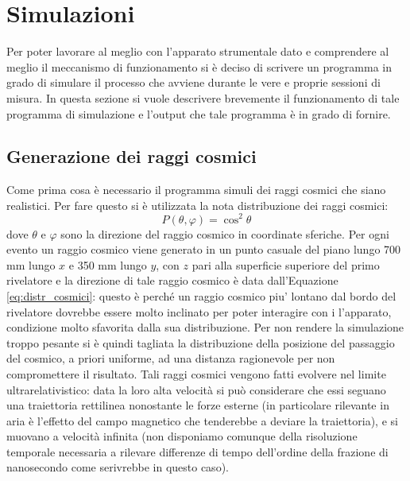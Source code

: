\section{Simulazioni}
Per poter lavorare al meglio con l'apparato strumentale dato e comprendere al meglio il meccanismo di funzionamento si è deciso di scrivere un programma in grado di simulare
il processo che avviene durante le vere e proprie sessioni di misura. In questa sezione si vuole descrivere brevemente il funzionamento di tale programma di simulazione e
l'output che tale programma è in grado di fornire.
\subsection{Generazione dei raggi cosmici}
Come prima cosa è necessario il programma simuli dei raggi cosmici che siano realistici. Per fare questo si è utilizzata la nota distribuzione dei raggi cosmici:
\begin{equation}
	P\left(\theta, \varphi\right) = \cos^2{\theta}
	\label{eq:distr_cosmici}
\end{equation}
dove $\theta$ e $\varphi$ sono la direzione del raggio cosmico in coordinate sferiche.
Per ogni evento un raggio cosmico viene generato in un punto casuale del piano lungo 700 mm lungo $x$ e 350 mm lungo $y$, con $z$ pari alla superficie superiore del primo rivelatore e la direzione di tale raggio cosmico è data dall'Equazione \ref{eq:distr_cosmici}: questo \`e perch\'e un raggio cosmico piu' lontano dal bordo del rivelatore dovrebbe essere molto inclinato per poter interagire con i l'apparato, condizione molto sfavorita dalla sua distribuzione. Per non rendere la simulazione troppo pesante si \`e quindi tagliata la distribuzione della posizione del passaggio del cosmico, a priori uniforme, ad una distanza ragionevole per non compromettere il risultato.
Tali raggi cosmici vengono fatti evolvere nel limite ultrarelativistico: data la loro alta velocità si può considerare che essi seguano una traiettoria rettilinea nonostante
le forze esterne (in particolare rilevante in aria è l'effetto del campo magnetico che tenderebbe a deviare la traiettoria), e si muovano a velocità infinita (non disponiamo comunque della risoluzione temporale necessaria a rilevare differenze di tempo dell'ordine della frazione di nanosecondo come serivrebbe in questo caso).

